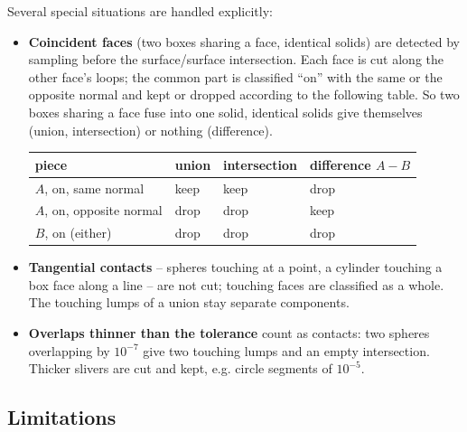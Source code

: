Several special situations are handled explicitly:

\begin{itemize}
\item \textbf{Coincident faces} (two boxes sharing a face, identical solids) are detected by
sampling before the surface/surface intersection. Each face is cut along the other face's
loops; the common part is classified ``on'' with the same or the opposite normal and kept or
dropped according to the following table. So two boxes sharing a face fuse into one solid,
identical solids give themselves (union, intersection) or nothing (difference).

\begin{center}
\begin{tabular}{@{}llll@{}}
\toprule
piece & union & intersection & difference $A-B$ \\
\midrule
$A$, on, same normal & keep & keep & drop \\
$A$, on, opposite normal & drop & drop & keep \\
$B$, on (either) & drop & drop & drop \\
\bottomrule
\end{tabular}
\end{center}

\item \textbf{Tangential contacts} -- spheres touching at a point, a cylinder touching a box
face along a line -- are not cut; touching faces are classified as a whole. The touching lumps
of a union stay separate components.
\item \textbf{Overlaps thinner than the tolerance} count as contacts: two spheres overlapping
by $10^{-7}$ give two touching lumps and an empty intersection. Thicker slivers are cut and
kept, e.g. circle segments of $10^{-5}$.
\end{itemize}

\subsection{Limitations}\label{sec:boolean-limits}


